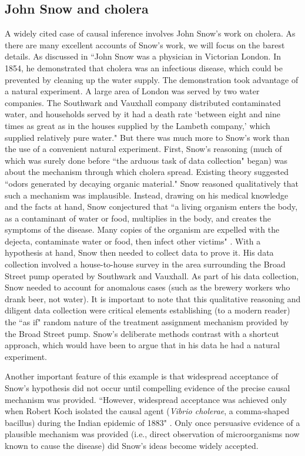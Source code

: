 \documentclass[12pt,reqno,titlepage]{amsart}
\begin{document}
\begin{doublespace}
\subsection{John Snow and cholera}
A widely cited case of causal inference involves John Snow's work on cholera. 
As there are many excellent accounts of Snow's work, we will focus on the barest details.
 As discussed in \citet[p.\,339]{Freedman:2009ur} ``John Snow was a physician in Victorian London. In 1854, he demonstrated that cholera was an infectious disease, which could be prevented by cleaning up the water supply. The demonstration took advantage of a natural experiment. A large area of London was served by two water companies. The Southwark and Vauxhall company distributed contaminated water, and households served by it had a death rate `between eight and nine times as great as in the houses supplied by the Lambeth company,' which supplied relatively pure water."
But there was much more to Snow's work than the use of a convenient natural experiment. 
First, Snow's reasoning (much of which was surely done before ``the arduous task of data collection" began) was about the mechanism through which cholera spread. Existing theory suggested ``odors generated by decaying organic material." 
 Snow reasoned qualitatively that such a mechanism was implausible.
 Instead, drawing on his medical knowledge and the facts at hand, Snow conjectured that ``a living organism enters the body, as a contaminant of water or food, multiplies in the body, and creates the symptoms of the disease. 
Many copies of the organism are expelled with the dejecta, contaminate water or food, then infect other victims" \citep[p.\,342]{Freedman:2009ur}.
 With a hypothesis at hand, Snow then needed to collect data to prove it. 
 His data collection involved a house-to-house survey in the area surrounding the Broad Street pump operated by Southwark and Vauxhall.
 As part of his data collection, Snow needed to account for anomalous cases (such as the brewery workers who drank beer, not water).
 It is important to note that this qualitative reasoning and diligent data collection were critical elements establishing (to a modern reader) the ``as if" random nature of the treatment assignment mechanism provided by the Broad Street pump. 
Snow's deliberate methods contrast with a shortcut approach, which would have been to argue that in his data he had a natural experiment. 
 
Another important feature of this example is that widespread acceptance of Snow's hypothesis did not occur until compelling evidence of the precise causal mechanism was provided. 
 ``However, widespread acceptance was achieved only when Robert Koch isolated the causal agent (\emph{Vibrio cholerae}, a comma-shaped bacillus) during the Indian epidemic of 1883" \citep[p. 342]{Freedman:2009ur}.
 Only once persuasive evidence of a plausible mechanism was provided (i.e., direct observation of microorganisms now known to cause the disease) did Snow's ideas become widely accepted. 
 

\end{doublespace}
\end{document}
